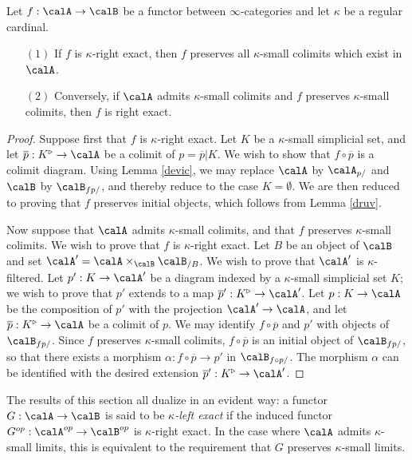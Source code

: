 \begin{proposition}\label{swarmmy}
Let $f: \calA \rightarrow \calB$ be a functor between $\infty$-categories and let $\kappa$ be a regular cardinal.

\begin{itemize}
\item[$(1)$] If $f$ is $\kappa$-right exact, then $f$ preserves all $\kappa$-small colimits
which exist in $\calA$.
\item[$(2)$] Conversely, if $\calA$ admits $\kappa$-small colimits and $f$ preserves $\kappa$-small colimits, then $f$ is right exact.
\end{itemize}
\end{proposition}

\begin{proof}
Suppose first that $f$ is $\kappa$-right exact. Let $K$ be a $\kappa$-small simplicial set, and
let $\overline{p}: K^{\triangleright} \rightarrow \calA$ be a colimit of $p = \overline{p}|K$. 
We wish to show that $f \circ \overline{p}$ is a colimit diagram. Using Lemma \ref{devic}, we may replace $\calA$ by $\calA_{p/}$ and $\calB$ by $\calB_{f p/}$, and thereby reduce to the case $K = \emptyset$. We are then reduced to proving that $f$ preserves initial objects, which follows from Lemma \ref{druv}.

Now suppose that $\calA$ admits $\kappa$-small colimits, and that $f$ preserves $\kappa$-small colimits. We wish to prove that $f$ is $\kappa$-right exact. Let $B$ be an object of $\calB$ and set
$\calA' = \calA \times_{\calB} \calB_{/B}$. We wish to prove that $\calA'$ is $\kappa$-filtered.
Let $p': K \rightarrow \calA'$ be a diagram indexed by a $\kappa$-small simplicial set $K$; we wish to prove that $p'$ extends to a map $\overline{p}': K^{\triangleright} \rightarrow \calA'$. Let $p: K \rightarrow \calA$ be the composition of $p'$ with the projection $\calA' \rightarrow \calA$, and
let $\overline{p}: K^{\triangleright} \rightarrow \calA$ be a colimit of $p$. We may identify
$f \circ \overline{p}$ and $p'$ with objects of $\calB_{f p/}$. Since $f$ preserves $\kappa$-small colimits, $f \circ \overline{p}$ is an initial object of $\calB_{f p/}$, so that there exists a morphism
$\alpha: f \circ \overline{p} \rightarrow p'$ in $\calB_{f \circ p/}$. The morphism $\alpha$
can be identified with the desired extension $\overline{p}': K^{\triangleright} \rightarrow \calA'$.
\end{proof}

\begin{remark}
The results of this section all dualize in an evident way: a functor $G: \calA \rightarrow \calB$
is said to be {\it $\kappa$-left exact} if the induced functor $G^{op}: \calA^{op} \rightarrow \calB^{op}$ is $\kappa$-right exact. In the case where $\calA$ admits $\kappa$-small limits, this is equivalent to the requirement that $G$ preserves $\kappa$-small limits.
\end{remark}

